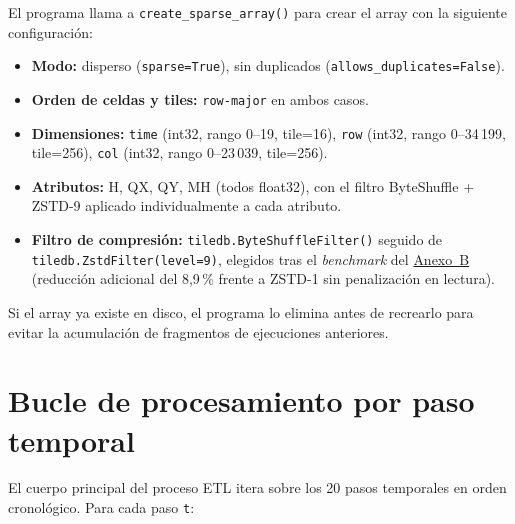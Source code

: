 El programa llama a \texttt{create\_sparse\_array()} para crear el array con la siguiente configuración:

\begin{itemize}
\item \textbf{Modo:} disperso (\texttt{sparse=True}), sin duplicados (\texttt{allows\_duplicates=False}).
\item \textbf{Orden de celdas y tiles:} \texttt{row-major} en ambos casos.
\item \textbf{Dimensiones:} \texttt{time} (int32, rango 0--19, tile=16), \texttt{row} (int32, rango 0--34\,199, tile=256), \texttt{col} (int32, rango 0--23\,039, tile=256).
\item \textbf{Atributos:} H, QX, QY, MH (todos float32), con el filtro ByteShuffle + ZSTD-9 aplicado individualmente a cada atributo.
\item \textbf{Filtro de compresión:} \texttt{tiledb.ByteShuffleFilter()} seguido de \texttt{tiledb.ZstdFilter(level=9)}, elegidos tras el \textit{benchmark} del \hyperref[anexo-b.-tablas-de-resultados-completas]{Anexo~B} (reducción adicional del 8,9\,\% frente a ZSTD-1 sin penalización en lectura).
\end{itemize}

Si el array ya existe en disco, el programa lo elimina antes de recrearlo para evitar la acumulación de fragmentos de ejecuciones anteriores.

\section{Bucle de procesamiento por paso temporal}\label{d.3-bucle-por-paso}

El cuerpo principal del proceso ETL itera sobre los 20 pasos temporales en orden cronológico. Para cada paso \texttt{t}:

